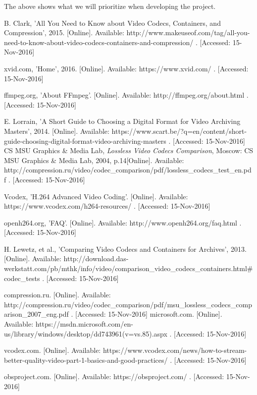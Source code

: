 \documentclass[letterpaper,10pt,onecolumn,draftclsnofoot]{IEEEtran}
\begin{document}
The above shows what we will prioritize when developing the project.

\newpage
\begin{thebibliography}{99}
B. Clark, 'All You Need to Know about Video Codecs, Containers, and Compression', 2015. [Online]. Available: http://www.makeuseof.com/tag/all-you-need-to-know-about-video-codecs-containers-and-compression/ . [Accessed: 15-Nov-2016]

xvid.com, 'Home', 2016. [Online]. Available: https://www.xvid.com/ . [Accessed: 15-Nov-2016]

ffmpeg.org, 'About FFmpeg'. [Online]. Available: http://ffmpeg.org/about.html . [Accessed: 15-Nov-2016]

E. Lorrain, 'A Short Guide to Choosing a Digital Format for Video Archiving Masters', 2014. [Online]. Available: https://www.scart.be/?q=en/content/short-guide-choosing-digital-format-video-archiving-masters . [Accessed: 15-Nov-2016]
CS MSU Graphics \& Media Lab, \textit{Lossless Video Codecs Comparison}, Moscow: CS MSU Graphics \& Media Lab, 2004, p.14[Online]. Available: http://compression.ru/video/codec\_comparison/pdf/lossless\_codecs\_test\_en.pdf . [Accessed: 15-Nov-2016]

Vcodex, 'H.264 Advanced Video Coding'. [Online]. Available: https://www.vcodex.com/h264-resources/ . [Accessed: 15-Nov-2016]

openh264.org, 'FAQ'. [Online]. Available: http://www.openh264.org/faq.html . [Accessed: 15-Nov-2016]

H. Lewetz, et al., 'Comparing Video Codecs and Containers for Archives', 2013. [Online]. Available: http://download.das-werkstatt.com/pb/mthk/info/video/comparison\_video\_codecs\_containers.html\#codec\_tests . [Accessed: 15-Nov-2016]

compression.ru. [Online]. Available: http://compression.ru/video/codec\_comparison/pdf/msu\_lossless\_codecs\_comparison\_2007\_eng.pdf . [Accessed: 15-Nov-2016]
microsoft.com. [Online]. Available: https://msdn.microsoft.com/en-us/library/windows/desktop/dd743961(v=vs.85).aspx . [Accessed: 15-Nov-2016]

vcodex.com. [Online]. Available: https://www.vcodex.com/news/how-to-stream-better-quality-video-part-1-basics-and-good-practices/ . [Accessed: 15-Nov-2016]

obsproject.com. [Online]. Available: https://obsproject.com/ . [Accessed: 15-Nov-2016] 


\end{thebibliography}
\end{document}
